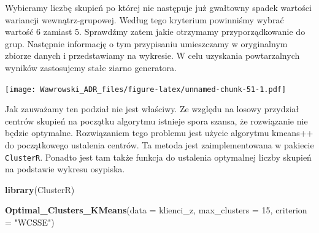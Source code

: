 \documentclass[]{book}
\newenvironment{Shaded}{\begin{snugshade}}{\end{snugshade}}
\newcommand{\DataTypeTok}[1]{\textcolor[rgb]{0.13,0.29,0.53}{#1}}
\newcommand{\DecValTok}[1]{\textcolor[rgb]{0.00,0.00,0.81}{#1}}
\newcommand{\KeywordTok}[1]{\textcolor[rgb]{0.13,0.29,0.53}{\textbf{#1}}}
\newcommand{\NormalTok}[1]{#1}
\newcommand{\OperatorTok}[1]{\textcolor[rgb]{0.81,0.36,0.00}{\textbf{#1}}}
\newcommand{\StringTok}[1]{\textcolor[rgb]{0.31,0.60,0.02}{#1}}
\begin{document}
Wybieramy liczbę skupień po której nie następuje już gwałtowny spadek wartości wariancji wewnątrz-grupowej. Według tego kryterium powinniśmy wybrać wartość 6 zamiast 5. Sprawdźmy zatem jakie otrzymamy przyporządkowanie do grup. Następnie informację o tym przypisaniu umieszczamy w oryginalnym zbiorze danych i przedstawiamy na wykresie. W celu uzyskania powtarzalnych wyników zastosujemy stałe ziarno generatora.

\begin{Shaded}
\end{Shaded}

\texttt{[image: Wawrowski\_ADR\_files/figure-latex/unnamed-chunk-51-1.pdf]}

Jak zauważamy ten podział nie jest właściwy. Ze względu na losowy przydział centrów skupień na początku algorytmu istnieje spora szansa, że rozwiązanie nie będzie optymalne. Rozwiązaniem tego problemu jest użycie algorytmu kmeans++ do początkowego ustalenia centrów. Ta metoda jest zaimplementowana w pakiecie \texttt{ClusterR}. Ponadto jest tam także funkcja do ustalenia optymalnej liczby skupień na podstawie wykresu osypiska.

\begin{Shaded}
\begin{Highlighting}[]
\KeywordTok{library}\NormalTok{(ClusterR)}

\KeywordTok{Optimal_Clusters_KMeans}\NormalTok{(}\DataTypeTok{data =}\NormalTok{ klienci_z, }\DataTypeTok{max_clusters =} \DecValTok{15}\NormalTok{, }\DataTypeTok{criterion =} \StringTok{"WCSSE"}\NormalTok{)}
\end{Highlighting}
\end{Shaded}
\end{document}
